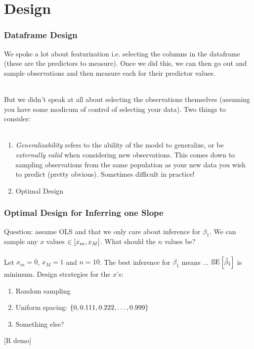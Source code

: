 \documentclass[slides]{beamer} %
\begin{document}
\section{Design}

\begin{frame}\frametitle{Dataframe Design}

We spoke a lot about featurization i.e. selecting the columns in the dataframe (these are the predictors to measure). Once we did this, we can then go out and sample observations and then measure each for their predictor values. \\~\\ \pause

But we didn't speak at all about selecting the observations themselves (assuming you have some modicum of control of selecting your data). Two things to consider: \\~\\  \pause

\begin{enumerate}
\item \emph{Generalizability} refers to the ability of the model to generalize, or be \emph{externally valid} when considering new observations. This comes down to sampling observations from the same population as your new data you wish to predict (pretty obvious). Sometimes difficult in practice! \pause
\item Optimal Design
\end{enumerate}

	
\end{frame}

\begin{frame}\frametitle{Optimal Design for Inferring one Slope}

Question: assume OLS and that we only care about inference for $\beta_1$. We can sample any $x$ values $\in \left[x_m, x_M\right]$. What should the $n$ values be? \\~\\

Let $x_m = 0$, $x_M = 1$ and $n = 10$. The best inference for $\beta_1$ means ... \pause $\mathbb{S}\text{E}\left[\hat{\beta}_1\right]$ is minimum. Design strategies for the $x$'s: \pause

\begin{enumerate}
\item Random sampling \pause
\item Uniform spacing: $\left\{0, 0.111, 0.222, \ldots, 0.999\right\}$ \pause
\item Something else?
\end{enumerate}

[R demo]

\end{frame}
\end{document}
